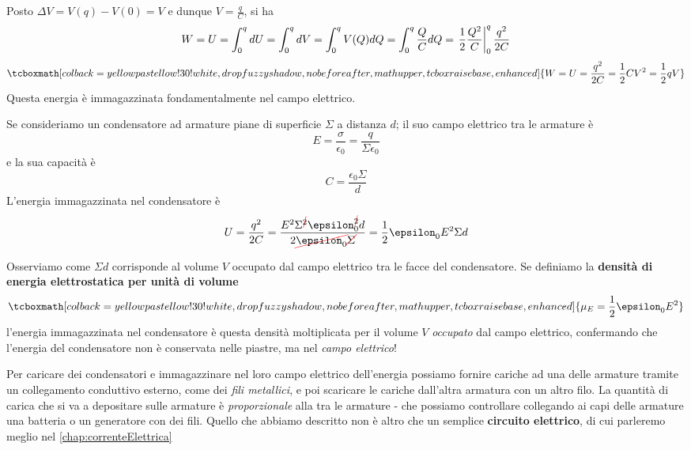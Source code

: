 Posto $\Delta V=V(q)-V(0)=V$ e dunque $V=\frac{q}{C}$, si ha
\begin{equation*}
	W=U=\int_{0}^{q}dU=\int_{0}^{q}dV=\int_0^{q}V(Q)dQ=\int_{0}^{q}\frac{Q}{C}dQ=\eval{\frac{1}{2}\frac{Q^2}{C}}_{0}^{q}\frac{q^2}{2C}
\end{equation*}
\begin{equation}
	\tcboxmath[colback=yellowpastellow!30!white,drop fuzzy shadow, nobeforeafter, math upper, tcbox raise base, enhanced]{W=U=\frac{q^2}{2C}=\frac{1}{2}CV^2=\frac{1}{2}qV}
\end{equation}
Questa energia è immagazzinata fondamentalmente nel campo elettrico.
\begin{examplewt}
	Se consideriamo un condensatore ad armature piane di superficie $\Sigma$ a distanza $d$; il suo campo elettrico tra le armature è
	\begin{equation*}
		E=\frac{\sigma}{\epsilon_0}=\frac{q}{\Sigma \epsilon_0}
	\end{equation*}
	e la sua capacità è
	\begin{equation*}
		C=\frac{\epsilon_0\Sigma}{d}
	\end{equation*}
	L'energia immagazzinata nel condensatore è
	\begin{equation*}
		U=\frac{q^2}{2C}=\frac{E^2\Sigma^{\Ccancel[red]{2}}\epsilon_0^{\Ccancel[red]{2}} d}{2\Ccancel[red]{\epsilon_0}\Ccancel[red]{\Sigma}}=\frac{1}{2}\epsilon_0E^2\Sigma d
	\end{equation*}
\end{examplewt} 
Osserviamo come $\Sigma d$ corrisponde al volume $V$ occupato dal campo elettrico tra le facce del condensatore. Se definiamo la \textbf{densità di energia elettrostatica per unità di volume}
\begin{equation}\label{DensitàEnergiaElettrostatica}
	\tcboxmath[colback=yellowpastellow!30!white,drop fuzzy shadow, nobeforeafter, math upper, tcbox raise base, enhanced]{\mu_{E}=\frac{1}{2}\epsilon_0E^2}
\end{equation}
l'energia immagazzinata nel condensatore è questa densità moltiplicata per il volume $V$ \textit{occupato} dal campo elettrico, confermando che l'energia del condensatore non è conservata nelle piastre, ma nel \textit{campo elettrico}!\\

\begin{observe}
	Per caricare dei condensatori e immagazzinare nel loro campo elettrico dell'energia possiamo fornire cariche ad una delle armature tramite un collegamento conduttivo esterno, come dei \textit{fili metallici}, e poi scaricare le cariche dall'altra armatura con un altro filo. La quantità di carica che si va a depositare sulle armature è \textit{proporzionale} alla \ddp tra le armature - che possiamo controllare collegando ai capi delle armature una batteria o un generatore con dei fili. Quello che abbiamo descritto non è altro che un semplice \textbf{circuito elettrico}, di cui parleremo meglio nel \autoref{chap:correnteElettrica}
\end{observe}
